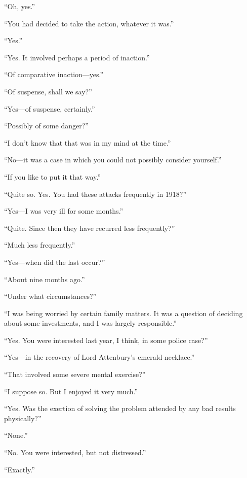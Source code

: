 \enquote{Oh, yes.}

\enquote{You had decided to take the action, whatever it was.}

\enquote{Yes.}

\enquote{Yes. It involved perhaps a period of inaction.}

\enquote{Of comparative inaction\allowbreak---\allowbreak yes.}

\enquote{Of suspense, shall we say?}

\enquote{Yes\allowbreak---\allowbreak of suspense, certainly.}

\enquote{Possibly of some danger?}

\enquote{I don’t know that that was in my mind at the time.}

\enquote{No\allowbreak---\allowbreak it was a case in which you could not possibly consider yourself.}

\enquote{If you like to put it that way.}

\enquote{Quite so. Yes. You had these attacks frequently in 1918?}

\enquote{Yes\allowbreak---\allowbreak I was very ill for some months.}

\enquote{Quite. Since then they have recurred less frequently?}

\enquote{Much less frequently.}

\enquote{Yes\allowbreak---\allowbreak when did the last occur?}

\enquote{About nine months ago.}

\enquote{Under what circumstances?}

\enquote{I was being worried by certain family matters. It was a question of deciding about some investments, and I was largely responsible.}

\enquote{Yes. You were interested last year, I think, in some police case?}

\enquote{Yes\allowbreak---\allowbreak in the recovery of Lord Attenbury’s emerald necklace.}

\enquote{That involved some severe mental exercise?}

\enquote{I suppose so. But I enjoyed it very much.}

\enquote{Yes. Was the exertion of solving the problem attended by any bad results physically?}

\enquote{None.}

\enquote{No. You were interested, but not distressed.}

\enquote{Exactly.}

